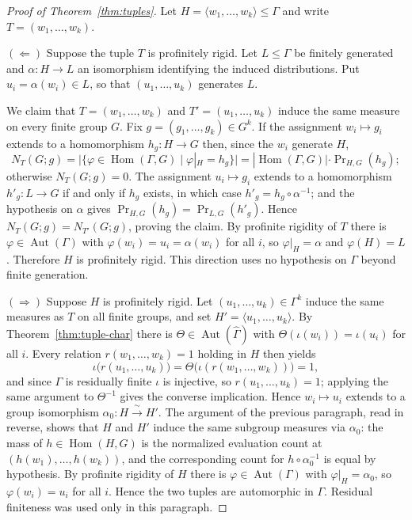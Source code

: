 \documentclass[11pt]{amsart}
\theoremstyle{plain}
\theoremstyle{definition}
\newcommand{\Hom}{\operatorname{Hom}}
\newcommand{\Aut}{\operatorname{Aut}}
\begin{document}
\begin{proof}[Proof of Theorem~\ref{thm:tuples}]
Let $H=\langle w_1,\dots,w_k\rangle\le\Gamma$ and write $T=(w_1,\dots,w_k)$.

$(\Leftarrow)$  Suppose the tuple $T$ is profinitely rigid.  Let $L\le\Gamma$ be
finitely generated and $\alpha\colon H\to L$ an isomorphism identifying the
induced distributions.  Put $u_i=\alpha(w_i)\in L$, so that $(u_1,\dots,u_k)$
generates $L$.

We claim that $T=(w_1,\dots,w_k)$ and $T'=(u_1,\dots,u_k)$ induce the same
measure on every finite group $G$.  Fix $g=(g_1,\dots,g_k)\in G^{k}$.  If the
assignment $w_i\mapsto g_i$ extends to a homomorphism $h_g\colon H\to G$ then,
since the $w_i$ generate $H$,
\[
  N_T(G;g)=\bigl|\{\varphi\in\Hom(\Gamma,G)\mid\varphi|_H=h_g\}\bigr|
  =|\Hom(\Gamma,G)|\cdot\Pr\nolimits_{H,G}(h_g);
\]
otherwise $N_T(G;g)=0$.  The assignment $u_i\mapsto g_i$ extends to a
homomorphism $h'_g\colon L\to G$ if and only if $h_g$ exists, in which case
$h'_g=h_g\circ\alpha^{-1}$; and the hypothesis on $\alpha$ gives
$\Pr_{H,G}(h_g)=\Pr_{L,G}(h'_g)$.  Hence $N_T(G;g)=N_{T'}(G;g)$, proving the
claim.  By profinite rigidity of $T$ there is $\varphi\in\Aut(\Gamma)$ with
$\varphi(w_i)=u_i=\alpha(w_i)$ for all $i$, so $\varphi|_H=\alpha$ and
$\varphi(H)=L$.  Therefore $H$ is profinitely rigid.  This direction uses no
hypothesis on $\Gamma$ beyond finite generation.

$(\Rightarrow)$  Suppose $H$ is profinitely rigid.  Let
$(u_1,\dots,u_k)\in\Gamma^{k}$ induce the same measures as $T$ on all finite
groups, and set $H'=\langle u_1,\dots,u_k\rangle$.  By
Theorem~\ref{thm:tuple-char} there is $\Theta\in\Aut(\widehat\Gamma)$ with
$\Theta(\iota(w_i))=\iota(u_i)$ for all $i$.  Every relation
$r(w_1,\dots,w_k)=1$ holding in $H$ then yields
\[
  \iota\bigl(r(u_1,\dots,u_k)\bigr)
  =\Theta\bigl(\iota(r(w_1,\dots,w_k))\bigr)=1,
\]
and since $\Gamma$ is residually finite $\iota$ is injective, so
$r(u_1,\dots,u_k)=1$; applying the same argument to $\Theta^{-1}$ gives the
  converse implication.  Hence $w_i\mapsto u_i$ extends to a group isomorphism
  $\alpha_0\colon H\xrightarrow{\ \sim\ }H'$.  The argument of the previous
  paragraph, read in reverse, shows that $H$ and $H'$ induce the same subgroup
  measures via $\alpha_0$: the mass of $h\in\Hom(H,G)$ is the normalized
  evaluation count at $(h(w_1),\dots,h(w_k))$, and the corresponding count for
  $h\circ\alpha_0^{-1}$ is equal by hypothesis.  By profinite rigidity of $H$ there is
$\varphi\in\Aut(\Gamma)$ with $\varphi|_H=\alpha_0$, so $\varphi(w_i)=u_i$ for
all $i$.  Hence the two tuples are automorphic in $\Gamma$.  Residual finiteness
was used only in this paragraph.
\end{proof}
\end{document}
